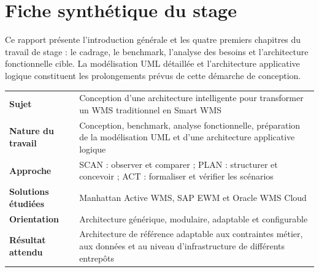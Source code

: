 \chapter*{Fiche synthétique du stage}
Ce rapport présente l’introduction générale et les quatre premiers chapitres du travail de stage : le cadrage, le benchmark, l’analyse des besoins et l’architecture fonctionnelle cible. La modélisation UML détaillée et l’architecture applicative logique constituent les prolongements prévus de cette démarche de conception.

\begin{tabularx}{\linewidth}{@{}P{37mm}X@{}}
\toprule
\textbf{Sujet} & Conception d’une architecture intelligente pour transformer un WMS traditionnel en Smart WMS\\[8pt]
\textbf{Nature du travail} & Conception, benchmark, analyse fonctionnelle, préparation de la modélisation UML et d’une architecture applicative logique\\[8pt]
\textbf{Approche} & SCAN : observer et comparer ; PLAN : structurer et concevoir ; ACT : formaliser et vérifier les scénarios\\[8pt]
\textbf{Solutions étudiées} & Manhattan Active WMS, SAP EWM et Oracle WMS Cloud\\[8pt]
\textbf{Orientation} & Architecture générique, modulaire, adaptable et configurable\\[8pt]
\textbf{Résultat attendu} & Architecture de référence adaptable aux contraintes métier, aux données et au niveau d’infrastructure de différents entrepôts\\
\bottomrule
\end{tabularx}
\clearpage
